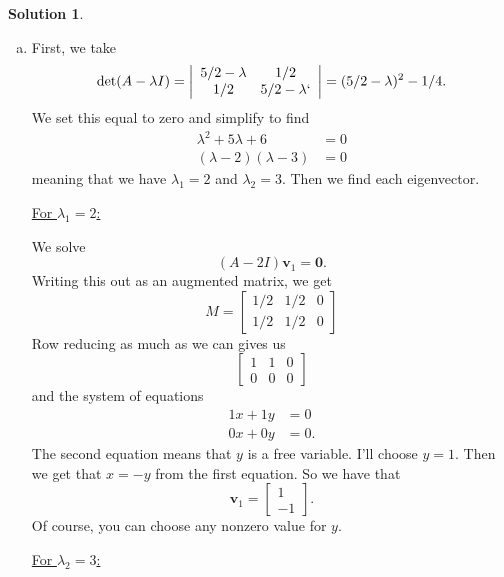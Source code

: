 \documentclass[12pt]{report} %
\theoremstyle{definition}
\newtheorem{solution}{Solution}
\begin{document}
\begin{solution}
\begin{enumerate}[(a)]
    \item First, we take
    \[
    \det(A-\lambda I)=\left| \begin{array}{cc}
        5/2-\lambda & 1/2 \\ 1/2 & 5/2-\lambda`
    \end{array}\right| = (5/2-\lambda)^2-1/4.
    \]
    We set this equal to zero and simplify to find
    \begin{align*}
    \lambda^2+5\lambda+6&=0\\
    (\lambda-2)(\lambda-3)&=0
    \end{align*}
    meaning that we have $\lambda_1=2$ and $\lambda_2=3$. Then we find each eigenvector. 
    
    \noindent\underline{For $\lambda_1=2$:}
    
    We solve 
    \[
    (A-2I)\mathbf{v}_1=\mathbf{0}.
    \]
    Writing this out as an augmented matrix, we get
    \[
    M=\left[ \begin{array}{cc|c}
        1/2 & 1/2 & 0\\
        1/2 & 1/2 & 0
    \end{array}\right]
    \]
    Row reducing as much as we can gives us
    \[
    \left[ \begin{array}{cc|c}
        1 & 1 & 0\\
        0 & 0 & 0
    \end{array}\right]
    \]
    and the system of equations
    \begin{align*}
        1x + 1y &=0\\
        0x+0y&=0.
    \end{align*}
    The second equation means that $y$ is a free variable.  I'll choose $y=1$.  Then we get that $x=-y$ from the first equation.  So we have that
    \[
    \mathbf{v}_1=\begin{bmatrix} 1 \\ -1 \end{bmatrix}.
    \]
    Of course, you can choose any nonzero value for $y$.
    
    \noindent\underline{For $\lambda_2=3$:}
    

\end{enumerate}
\end{solution}
\end{document}
